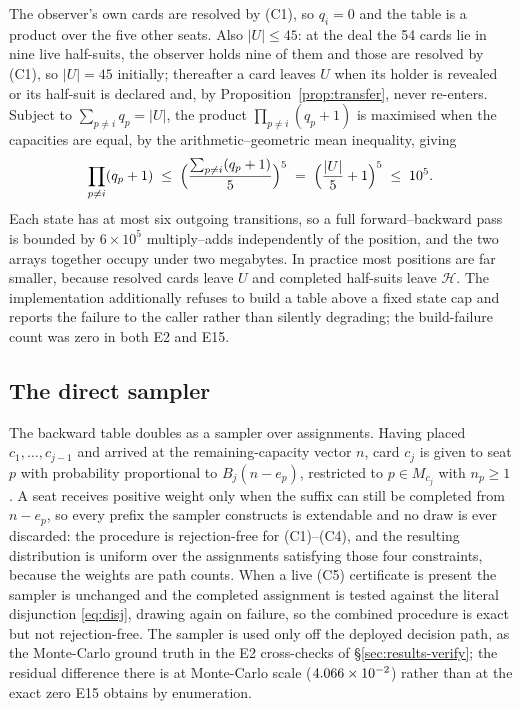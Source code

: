 The observer's own cards are resolved by (C1), so $q_i = 0$ and the table is a
product over the five other seats. Also $|U| \le 45$: at the deal the 54 cards
lie in nine live half-suits, the observer holds nine of them and those are
resolved by (C1), so $|U| = 45$ initially; thereafter a card leaves $U$ when its
holder is revealed or its half-suit is declared and, by
Proposition~\ref{prop:transfer}, never re-enters. Subject to $\sum_{p\ne i} q_p =
|U|$, the product $\prod_{p \ne i}(q_p+1)$ is maximised when the capacities are
equal, by the arithmetic--geometric mean inequality, giving
\begin{equation}
  \prod_{p\ne i}(q_p+1) \;\le\; \Bigl(\frac{\sum_{p \ne i}(q_p+1)}{5}\Bigr)^{5}
  \;=\; \Bigl(\frac{|U|}{5}+1\Bigr)^{5} \;\le\; 10^{5}.
  \label{eq:bound}
\end{equation}
Each state has at most six outgoing transitions, so a
full forward--backward pass is bounded by $6 \times 10^5$ multiply--adds
independently of the position, and the two arrays together occupy under two
megabytes. In practice most positions are far smaller, because resolved cards
leave $U$ and completed half-suits leave $\mathcal{H}$. The implementation
additionally refuses to build a table above a fixed state cap and reports the
failure to the caller rather than silently degrading; the build-failure count was
zero in both E2 and E15.

\subsection{The direct sampler}
\label{app:sampler}

The backward table doubles as a sampler over assignments. Having placed
$c_1,\dots,c_{j-1}$ and arrived at the remaining-capacity vector $n$, card $c_j$
is given to seat $p$ with probability proportional to $B_j(n - e_p)$, restricted
to $p \in M_{c_j}$ with $n_p \ge 1$. A seat receives positive weight only when
the suffix can still be completed from $n - e_p$, so every prefix the sampler
constructs is extendable and no draw is ever discarded: the procedure is
rejection-free for (C1)--(C4), and the resulting distribution is uniform over the
assignments satisfying those four constraints, because the weights are
path counts. When a live (C5) certificate is present the sampler is unchanged and
the completed assignment is tested against the literal disjunction
\eqref{eq:disj}, drawing again on failure, so the combined procedure is exact but
not rejection-free. The sampler
is used only off the deployed decision path, as the Monte-Carlo ground truth in
the E2 cross-checks of \S\ref{sec:results-verify}; the residual difference there
is at Monte-Carlo scale ($4.066\times 10^{-2}$) rather than at the exact zero
E15 obtains by enumeration.

